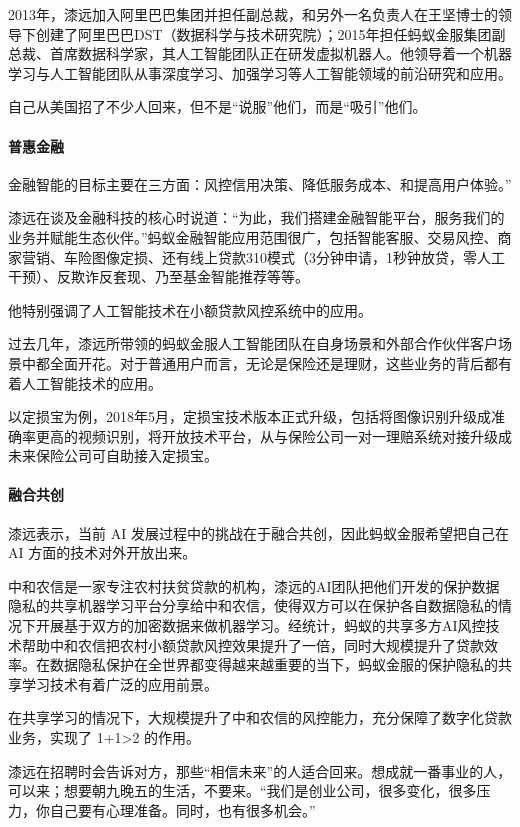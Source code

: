 \documentclass[letterpaper,11pt,english]{sphinxmanual}
\begin{document}
2013年，漆远加入阿里巴巴集团并担任副总裁，和另外一名负责人在王坚博士的领导下创建了阿里巴巴DST（数据科学与技术研究院）；2015年担任蚂蚁金服集团副总裁、首席数据科学家，其人工智能团队正在研发虚拟机器人。他领导着一个机器学习与人工智能团队从事深度学习、加强学习等人工智能领域的前沿研究和应用。

自己从美国招了不少人回来，但不是“说服”他们，而是“吸引”他们。


\paragraph{普惠金融}
\label{\detokenize{chapter_AI_dive/qi_yuan:id3}}
金融智能的目标主要在三方面：风控信用决策、降低服务成本、和提高用户体验。”

漆远在谈及金融科技的核心时说道：“为此，我们搭建金融智能平台，服务我们的业务并赋能生态伙伴。”蚂蚁金融智能应用范围很广，包括智能客服、交易风控、商家营销、车险图像定损、还有线上贷款310模式（3分钟申请，1秒钟放贷，零人工干预）、反欺诈反套现、乃至基金智能推荐等等。

他特别强调了人工智能技术在小额贷款风控系统中的应用。

过去几年，漆远所带领的蚂蚁金服人工智能团队在自身场景和外部合作伙伴客户场景中都全面开花。对于普通用户而言，无论是保险还是理财，这些业务的背后都有着人工智能技术的应用。

以定损宝为例，2018年5月，定损宝技术版本正式升级，包括将图像识别升级成准确率更高的视频识别，将开放技术平台，从与保险公司一对一理赔系统对接升级成未来保险公司可自助接入定损宝。


\paragraph{融合共创}
\label{\detokenize{chapter_AI_dive/qi_yuan:id4}}
漆远表示，当前 AI 发展过程中的挑战在于融合共创，因此蚂蚁金服希望把自己在
AI 方面的技术对外开放出来。

中和农信是一家专注农村扶贫贷款的机构，漆远的AI团队把他们开发的保护数据隐私的共享机器学习平台分享给中和农信，使得双方可以在保护各自数据隐私的情况下开展基于双方的加密数据来做机器学习。经统计，蚂蚁的共享多方AI风控技术帮助中和农信把农村小额贷款风控效果提升了一倍，同时大规模提升了贷款效率。在数据隐私保护在全世界都变得越来越重要的当下，蚂蚁金服的保护隐私的共享学习技术有着广泛的应用前景。

在共享学习的情况下，大规模提升了中和农信的风控能力，充分保障了数字化贷款业务，实现了
1+1>2 的作用。

漆远在招聘时会告诉对方，那些“相信未来”的人适合回来。想成就一番事业的人，可以来；想要朝九晚五的生活，不要来。“我们是创业公司，很多变化，很多压力，你自己要有心理准备。同时，也有很多机会。”
\end{document}
